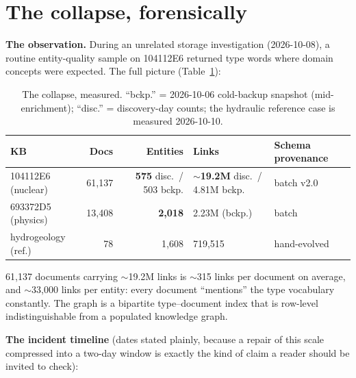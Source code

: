\documentclass[preprint,12pt]{elsarticle}
\begin{document}
\section{The collapse, forensically}
\label{sec:collapse}

\textbf{The observation.} During an unrelated storage investigation
(2026-10-08), a routine entity-quality sample on 104112E6 returned type
words where domain concepts were expected. The full picture
(Table~\ref{tab:collapse}):

\begin{table}[t]
\centering
\caption{The collapse, measured. ``bckp.'' = 2026-10-06 cold-backup
snapshot (mid-enrichment); ``disc.'' = discovery-day counts; the
hydraulic reference case is measured 2026-10-10.}
\label{tab:collapse}
\small
\setlength{\tabcolsep}{4pt}
\begin{tabularx}{\textwidth}{@{}lrrXX@{}}
\toprule
KB & Docs & Entities & Links & Schema provenance \\
\midrule
104112E6 (nuclear) & 61{,}137 & \textbf{575} disc.\ / 503 bckp. & \textbf{${\sim}$19.2M} disc.\ / 4.81M bckp. & batch v2.0 \\
693372D5 (physics) & 13{,}408 & \textbf{2{,}018} & 2.23M (bckp.) & batch \\
hydrogeology (ref.) & 78 & 1{,}608 & 719{,}515 & hand-evolved \\
\bottomrule
\end{tabularx}
\end{table}

61{,}137 documents carrying ${\sim}$19.2M links is ${\sim}$315 links per
document on average, and ${\sim}$33{,}000 links per entity: every document
``mentions'' the type vocabulary constantly. The graph is a bipartite
type--document index that is row-level indistinguishable from a
populated knowledge graph.

\textbf{The incident timeline} (dates stated plainly, because a repair of
this scale compressed into a two-day window is exactly the kind of claim
a reader should be invited to check):
\end{document}
